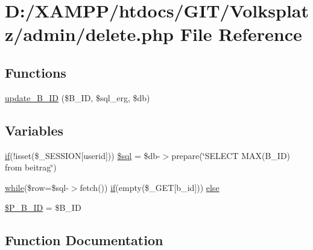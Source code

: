 \hypertarget{delete_8php}{}\section{D\+:/\+X\+A\+M\+P\+P/htdocs/\+G\+I\+T/\+Volksplatz/admin/delete.php File Reference}
\label{delete_8php}
\subsection*{Functions}
\begin{DoxyCompactItemize}
\item 
\mbox{\hyperlink{delete_8php_a2a35bc31009c50ecafc0c599244a64f9}{update\+\_\+\+B\+\_\+\+ID}} (\$B\+\_\+\+ID, \$sql\+\_\+erg, \$db)
\end{DoxyCompactItemize}
\subsection*{Variables}
\begin{DoxyCompactItemize}
\item 
\mbox{\hyperlink{view__all_8php_ac0971e25a4f61580752c758ef520f6b2}{if}}(!isset(\$\+\_\+\+S\+E\+S\+S\+I\+ON\mbox{[}\textquotesingle{}userid\textquotesingle{}\mbox{]})) \mbox{\hyperlink{delete_8php_af60ab9f57a5a8e687306d378c3805f1f}{\$sql}} = \$db-\/$>$prepare(\char`\"{}S\+E\+L\+E\+CT M\+AX(B\+\_\+\+ID) from beitrag\char`\"{})
\item 
\mbox{\hyperlink{showpost_8php_a0074fdcf62116989383290ee4de5f453}{while}}(\$row=\$sql-\/$>$fetch()) \mbox{\hyperlink{view__all_8php_ac0971e25a4f61580752c758ef520f6b2}{if}}(empty(\$\+\_\+\+G\+ET\mbox{[}\textquotesingle{}b\+\_\+id\textquotesingle{}\mbox{]})) \mbox{\hyperlink{delete_8php_a52ade24bab69d94ccf1510da71182d8f}{else}}
\item 
\mbox{\hyperlink{delete_8php_ac27e6a209599b3eb2a927530db7d30a2}{\$\+P\+\_\+\+B\+\_\+\+ID}} = \$B\+\_\+\+ID
\end{DoxyCompactItemize}


\subsection{Function Documentation}
\mbox{\label{delete_8php_a2a35bc31009c50ecafc0c599244a64f9}} 
